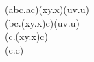 \documentclass{article}
\begin{document}
\begin{flushleft}

(\lambda a\:b\:c.a\:c)\:(\lambda x\:y.x)\:(\lambda u\:v.u) \rightarrow \\ 
(\lambda b\:c.(\lambda x\:y.x)\:c)\:(\lambda u\:v.u) \rightarrow \\ 
(\lambda c.(\lambda x\:y.x)\:c) \rightarrow \\  
(\lambda c.c) 

\end{flushleft}
\end{document}
